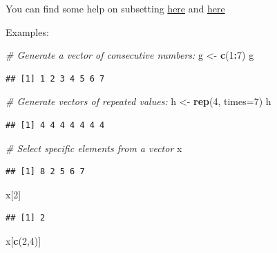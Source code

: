 \documentclass[
]{article}
\newenvironment{Shaded}{\begin{snugshade}}{\end{snugshade}}
\newcommand{\CommentTok}[1]{\textcolor[rgb]{0.56,0.35,0.01}{\textit{#1}}}
\newcommand{\DataTypeTok}[1]{\textcolor[rgb]{0.13,0.29,0.53}{#1}}
\newcommand{\DecValTok}[1]{\textcolor[rgb]{0.00,0.00,0.81}{#1}}
\newcommand{\KeywordTok}[1]{\textcolor[rgb]{0.13,0.29,0.53}{\textbf{#1}}}
\newcommand{\NormalTok}[1]{#1}
\newcommand{\OperatorTok}[1]{\textcolor[rgb]{0.81,0.36,0.00}{\textbf{#1}}}
\newcommand{\StringTok}[1]{\textcolor[rgb]{0.31,0.60,0.02}{#1}}
\begin{document}
You can find some help on subsetting
\href{http://www.statmethods.net/management/subset.html}{here} and
\href{http://adv-r.had.co.nz/Subsetting.html}{here}

Examples:

\begin{Shaded}
\begin{Highlighting}[]
\CommentTok{# Generate a vector of consecutive numbers:}
\NormalTok{g <-}\StringTok{ }\KeywordTok{c}\NormalTok{(}\DecValTok{1}\OperatorTok{:}\DecValTok{7}\NormalTok{)}
\NormalTok{g}
\end{Highlighting}
\end{Shaded}

\begin{verbatim}
## [1] 1 2 3 4 5 6 7
\end{verbatim}

\begin{Shaded}
\begin{Highlighting}[]
\CommentTok{# Generate vectors of repeated values:}
\NormalTok{h <-}\StringTok{ }\KeywordTok{rep}\NormalTok{(}\DecValTok{4}\NormalTok{, }\DataTypeTok{times=}\DecValTok{7}\NormalTok{)}
\NormalTok{h}
\end{Highlighting}
\end{Shaded}

\begin{verbatim}
## [1] 4 4 4 4 4 4 4
\end{verbatim}

\begin{Shaded}
\begin{Highlighting}[]
\CommentTok{# Select specific elements from a vector}
\NormalTok{x}
\end{Highlighting}
\end{Shaded}

\begin{verbatim}
## [1] 8 2 5 6 7
\end{verbatim}

\begin{Shaded}
\begin{Highlighting}[]
\NormalTok{x[}\DecValTok{2}\NormalTok{]}
\end{Highlighting}
\end{Shaded}

\begin{verbatim}
## [1] 2
\end{verbatim}

\begin{Shaded}
\begin{Highlighting}[]
\NormalTok{x[}\KeywordTok{c}\NormalTok{(}\DecValTok{2}\NormalTok{,}\DecValTok{4}\NormalTok{)]}
\end{Highlighting}
\end{Shaded}
\end{document}
